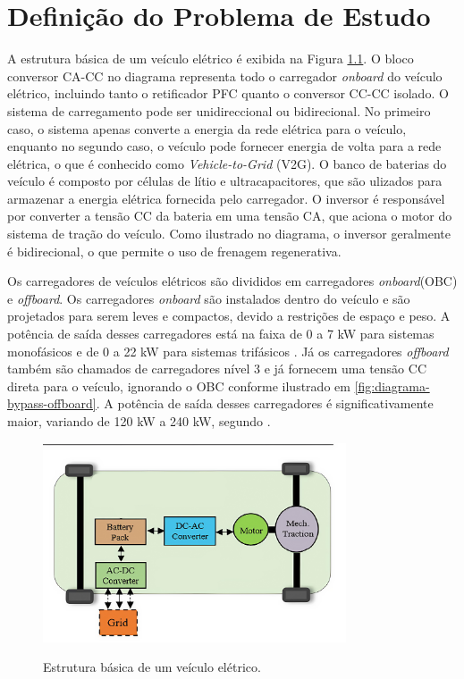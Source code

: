 \chapter{Definição do Problema de Estudo}

A estrutura básica de um veículo elétrico é exibida na Figura
\ref{fig:estrutura-veiculo-eletrico}. O bloco conversor CA-CC no diagrama representa todo o
carregador \textit{onboard} do veículo elétrico, incluindo tanto o retificador PFC quanto o
conversor CC-CC isolado. O sistema de carregamento pode ser unidireccional ou bidirecional. No
primeiro caso, o sistema apenas converte a energia da rede elétrica para o veículo, enquanto no
segundo caso, o veículo pode fornecer energia de volta para a rede elétrica, o que é conhecido
como \textit{Vehicle-to-Grid} (V2G). O banco de baterias do veículo é composto por células de
lítio e ultracapacitores, que são ulizados para armazenar a energia elétrica fornecida pelo
carregador. O inversor é responsável por converter a tensão CC da bateria em uma tensão CA, que
aciona o motor do sistema de tração do veículo. Como ilustrado no diagrama, o inversor
geralmente é bidirecional, o que permite o uso de frenagem regenerativa.

Os carregadores de veículos elétricos são divididos em carregadores \textit{onboard}(OBC) e
\textit{offboard}. Os carregadores \textit{onboard} são instalados dentro do veículo e são
projetados para serem leves e compactos, devido a restrições de espaço e peso. A potência de
saída desses carregadores está na faixa de 0 a 7 kW para sistemas monofásicos e de 0 a 22 kW
para sistemas trifásicos \cite{Yuan:2021}. Já os carregadores \textit{offboard} também são
chamados de carregadores nível 3 e já fornecem uma tensão CC direta para o veículo, ignorando o
OBC conforme ilustrado em \ref{fig:diagrama-bypass-offboard}. A potência de saída desses
carregadores é significativamente maior, variando de 120 kW a 240 kW, segundo
\cite{texas:2020}.

\begin{figure}[htb]
    \centering
    \caption{Estrutura básica de um veículo elétrico.}
    \includegraphics[width=0.8\textwidth]{figuras/diagrama_veiculo_eletrico_edit.png}
    \label{fig:estrutura-veiculo-eletrico}
\end{figure}

